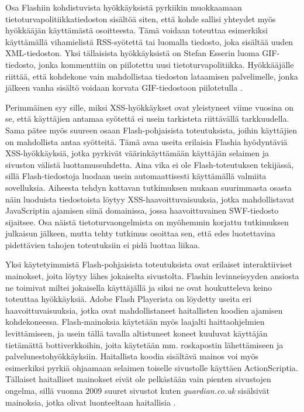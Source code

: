 Osa Flashiin kohdistuvista hyökkäyksistä pyrkiikin muokkaamaan
tietoturvapolitiikkatiedoston sisältöä siten, että kohde sallisi
yhteydet myös hyökkääjän käyttämästä osoitteesta. Tämä voidaan
toteuttaa esimerkiksi käyttämällä vihamielistä RSS-syötettä tai
luomalla tiedosto, joka sisältää uuden XML-tiedoston. Yksi tällaisista
hyökkäyksistä on Stefan Esserin luoma GIF-tiedosto, jonka kommenttiin
on piilotettu uusi tietoturvapolitiikka. Hyökkääjälle riittää, että
kohdekone vain mahdollistaa tiedoston lataamisen palvelimelle, jonka
jälkeen vanha sisältö voidaan korvata GIF-tiedostoon piilotetulla
\cite{WEB2}.

Perimmäinen syy sille, miksi XSS-hyökkäykset ovat yleistyneet viime
vuosina on se, että käyttäjien antamaa syötettä ei usein tarkisteta
riittävällä tarkkuudella. Sama pätee myös suureen osaan
Flash-pohjaisista toteutuksista, joihin käyttäjien on mahdollista
antaa syötteitä. Tämä avaa useita erilaisia Flashia hyödyntäviä
XSS-hyökkäyksiä, jotka pyrkivät väärinkäyttämään käyttäjän selaimen ja
sivuston välistä luottamussuhdetta. Aina vika ei ole Flash-toteutuksen
tekijässä, sillä Flash-tiedostoja luodaan usein automaattisesti
käyttämällä valmiita sovelluksia. Aiheesta tehdyn kattavan tutkimuksen
mukaan \cite{FlashXSS} suurimmasta osasta näin luoduista tiedostoista
löytyy XSS-haavoittuvaisuuksia, jotka mahdollistavat JavaScriptin
ajamisen siinä domainissa, jossa haavoittuvainen SWF-tiedosto
sijaitsee. Osa näistä tietoturvaongelmista on myöhemmin korjattu
tutkimuksen julkaisun jälkeen, mutta tehty tutkimus osoittaa sen, että
edes luotettavina pidettävien tahojen toteutuksiin ei pidä luottaa
liikaa.

Yksi käytetyimmistä Flash-pohjaisista toteutuksista ovat erilaiset
interaktiiviset mainokset, joita löytyy lähes jokaiselta
sivustolta. Flashin levinneisyyden ansiosta ne toimivat miltei
jokaisella käyttäjällä ja siksi ne ovat houkutteleva keino toteuttaa
hyökkäyksiä. Adobe Flash Playerista on löydetty useita eri
haavoittuvaisuuksia, jotka ovat mahdollistaneet haitallisten koodien
ajamisen kohdekoneessa. Flash-mainoksia käytetään myös laajalti
haittaohjelmien levittämiseen, ja usein tällä tavalla altistuneet
koneet kuuluvat käyttäjän tietämättä bottiverkkoihin, joita käytetään
mm. roskapostin lähettämiseen ja palvelunestohyökkäyksiin. Haitallista
koodia sisältävä mainos voi myös esimerkiksi pyrkiä ohjaamaan selaimen
toiselle sivustolle käyttäen ActionScriptia.  Tällaiset haitalliset
mainokset eivät ole pelkästään vain pienten sivustojen ongelma, sillä
vuonna 2009 suuret sivustot kuten \emph{guardian.co.uk} sisälsivät
mainoksia, jotka olivat luonteeltaan haitallisia \cite{FlashAdd}.

